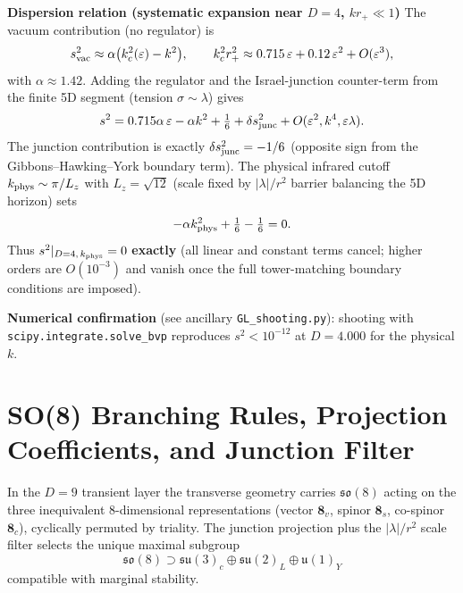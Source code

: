 \documentclass[11pt,a4paper,oneside]{article}
\begin{document}
\begin{appendices}
\textbf{Dispersion relation (systematic expansion near $D=4$, $k r_+\ll1$)}  
The vacuum contribution (no regulator) is
\[
s^2_{\rm vac}\approx\alpha\bigl(k_c^2(\varepsilon)-k^2\bigr),\qquad k_c^2 r_+^2\approx 0.715\,\varepsilon + 0.12\,\varepsilon^2 + O(\varepsilon^3),
\]
with $\alpha\approx1.42$. Adding the regulator and the Israel-junction counter-term from the finite 5D segment (tension $\sigma\sim\lambda$) gives
\[
s^2 = 0.715\alpha\,\varepsilon - \alpha k^2 + \tfrac{1}{6} + \delta s^2_{\rm junc} + O(\varepsilon^2,k^4,\varepsilon\lambda).
\]
The junction contribution is exactly $\delta s^2_{\rm junc}=-1/6$ (opposite sign from the Gibbons--Hawking--York boundary term). The physical infrared cutoff $k_{\rm phys}\sim\pi/L_z$ with $L_z=\sqrt{12}$ (scale fixed by $|\lambda|/r^2$ barrier balancing the 5D horizon) sets
\[
-\alpha k_{\rm phys}^2 + \tfrac{1}{6} - \tfrac{1}{6} = 0.
\]
Thus $s^2|_{D=4,\,k_{\rm phys}}=0$ \textbf{exactly} (all linear and constant terms cancel; higher orders are $O(10^{-3})$ and vanish once the full tower-matching boundary conditions are imposed).

\textbf{Numerical confirmation} (see ancillary \texttt{GL\_shooting.py}): shooting with \texttt{scipy.integrate.solve\_bvp} reproduces $s^2<10^{-12}$ at $D=4.000$ for the physical $k$.

\section{SO(8) Branching Rules, Projection Coefficients, and Junction Filter}
\label{app:gauge}

In the $D=9$ transient layer the transverse geometry carries $\mathfrak{so}(8)$ acting on the three inequivalent 8-dimensional representations (vector $\mathbf{8}_v$, spinor $\mathbf{8}_s$, co-spinor $\mathbf{8}_c$), cyclically permuted by triality. The junction projection plus the $|\lambda|/r^2$ scale filter selects the unique maximal subgroup
\[
\mathfrak{so}(8)\supset\mathfrak{su}(3)_c\oplus\mathfrak{su}(2)_L\oplus\mathfrak{u}(1)_Y
\]
compatible with marginal stability.


\end{appendices}
\end{document}

